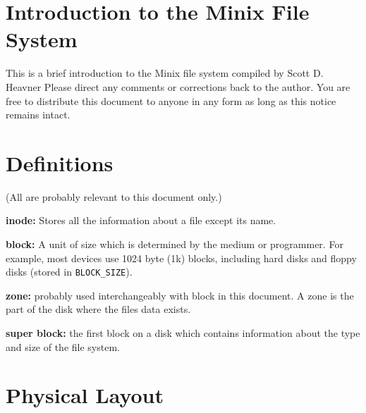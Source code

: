 
% 
%
%
\parindent 0pt
\parskip 5pt
\topmargin 0pt
\textheight 9in
\textwidth 6.5in
\oddsidemargin 0pt
\evensidemargin 0pt
\pagestyle{myheadings}



\section*{Introduction to the Minix File System}

This is a brief introduction to the Minix file system compiled by
Scott D. Heavner \linebreak[4]
Please direct any comments or
corrections back to the author.  You are free to distribute this
document to anyone in any form as long as this notice remains intact.

\section{Definitions}

(All are probably relevant to this document only.)

{\bf inode:} Stores all the information about a file except its
name.

{\bf block:} A unit of size which is determined by the medium or
programmer.  For example, most devices use 1024 byte (1k) blocks,
including hard disks and floppy disks (stored in {\tt BLOCK\_SIZE}).

{\bf zone:} probably used interchangeably with block in this document.
A zone is the part of the disk where the files data exists.

{\bf super block:} the first block on a disk which contains
information about the type and size of the file system.

\section{Physical Layout}

